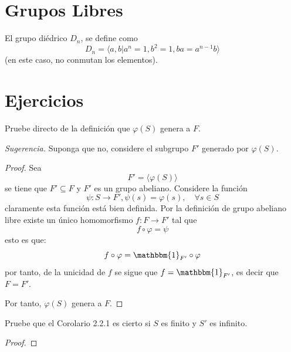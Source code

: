 \documentclass[12pt]{report}
\theoremstyle{largebreak}
\newcommand\cf[3]{\ensuremath{#1:#2\rightarrow#3}}
\newcommand{\bbm}[1]{\mathbbm{#1}}
\begin{document}
    \section{Grupos Libres}

    \begin{exa}
        El grupo diédrico $D_n$, se define como
        \begin{equation*}
            D_n=\langle a,b\Big|a^n=1,b^2=1,ba=a^{n-1}b \rangle
        \end{equation*}
        (en este caso, no conmutan los elementos).
    \end{exa}

    \newpage

    \section{Ejercicios}

    \begin{excer}
        Pruebe directo de la definición que $\varphi(S)$ genera a $F$.

        \textit{Sugerencia.} Suponga que no, considere el subgrupo $F'$ generado por $\varphi(S)$.
    \end{excer}

    \begin{proof}
        Sea
        \begin{equation*}
            F'=\langle\varphi(S)\rangle
        \end{equation*}
        se tiene que $F'\subseteq F$ y $F'$ es un grupo abeliano. Considere la función
        \begin{equation*}
            \cf{\psi}{S}{F'},\psi(s)=\varphi(s),\quad\forall s\in S
        \end{equation*}
        claramente esta función está bien definida. Por la definición de grupo abeliano libre existe un único homomorfismo $\cf{f}{F}{F'}$ tal que
        \begin{equation*}
            f\circ\varphi=\psi
        \end{equation*}
        esto es que:
        \begin{equation*}
            f\circ\varphi=\bbm{1}_{F'}\circ\varphi
        \end{equation*}
        por tanto, de la unicidad de $f$ se sigue que $f=\bbm{1}_{F'}$, es decir que $F=F'$.

        Por tanto, $\varphi(S)$ genera a $F$.
    \end{proof}

    \begin{excer}
        Pruebe que el Corolario 2.2.1 es cierto si $S$ es finito y $S'$ es infinito.
    \end{excer}
    
    \begin{proof}
        
    \end{proof}

    
    \begin{excer}[Nombre]
        
    \end{excer}
\end{document}
